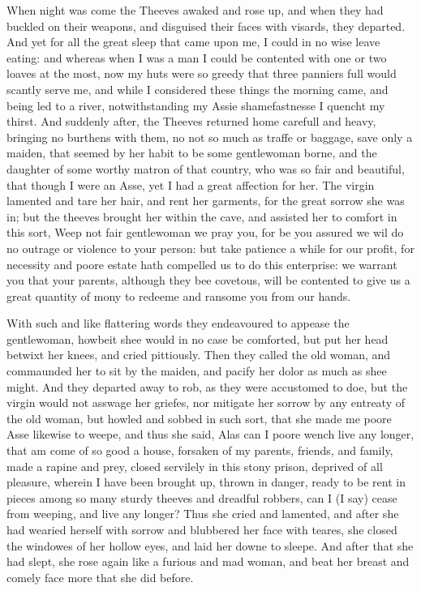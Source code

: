When night was come the Theeves awaked and rose up, and when they had buckled
on their weapons, and disguised their faces with visards, they departed. And
yet for all the great sleep that came upon me, I could in no wise leave eating:
and whereas when I was a man I could be contented with one or two loaves at the
most, now my huts were so greedy that three panniers full would scantly serve
me, and while I considered these things the morning came, and being led to a
river, notwithstanding my Assie shamefastnesse I quencht my thirst. And
suddenly after, the Theeves returned home carefull and heavy, bringing no
burthens with them, no not so much as traffe or baggage, save only a maiden,
that seemed by her habit to be some gentlewoman borne, and the daughter of some
worthy matron of that country, who was so fair and beautiful, that though I
were an Asse, yet I had a great affection for her. The virgin lamented and tare
her hair, and rent her garments, for the great sorrow she was in; but the
theeves brought her within the cave, and assisted her to comfort in this sort,
Weep not fair gentlewoman we pray you, for be you assured we wil do no outrage
or violence to your person: but take patience a while for our profit, for
necessity and poore estate hath compelled us to do this enterprise: we warrant
you that your parents, although they bee covetous, will be contented to give us
a great quantity of mony to redeeme and ransome you from our hands.

With such and like flattering words they endeavoured to appease the
gentlewoman, howbeit shee would in no case be comforted, but put her head
betwixt her knees, and cried pittiously. Then they called the old woman, and
commaunded her to sit by the maiden, and pacify her dolor as much as shee
might. And they departed away to rob, as they were accustomed to doe, but the
virgin would not asswage her griefes, nor mitigate her sorrow by any entreaty
of the old woman, but howled and sobbed in such sort, that she made me poore
Asse likewise to weepe, and thus she said, Alas can I poore wench live any
longer, that am come of so good a house, forsaken of my parents, friends, and
family, made a rapine and prey, closed servilely in this stony prison, deprived
of all pleasure, wherein I have been brought up, thrown in danger, ready to be
rent in pieces among so many sturdy theeves and dreadful robbers, can I (I say)
cease from weeping, and live any longer? Thus she cried and lamented, and after
she had wearied herself with sorrow and blubbered her face with teares, she
closed the windowes of her hollow eyes, and laid her downe to sleepe. And after
that she had slept, she rose again like a furious and mad woman, and beat her
breast and comely face more that she did before.

